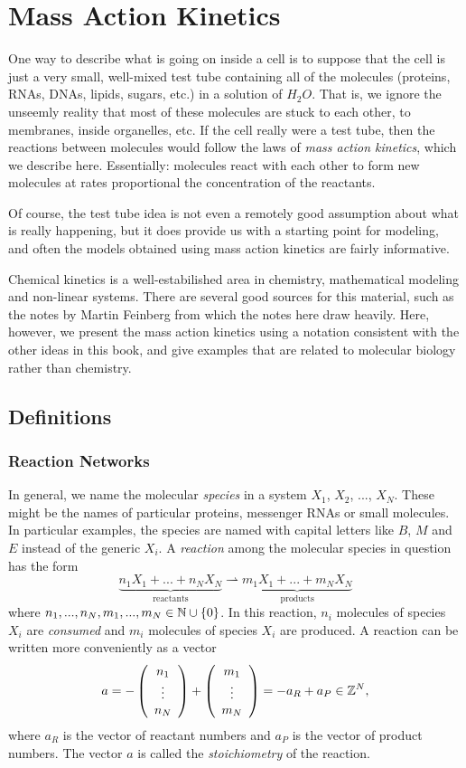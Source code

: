 \chapter{Mass Action Kinetics} \label{ch:mak}

One way to describe what is going on inside a cell is to suppose that
the cell is just a very small, well-mixed test tube containing all of
the molecules (proteins, RNAs, DNAs, lipids, sugars, etc.) in a
solution of $H_2O$. That is, we ignore the unseemly reality that most
of these molecules are stuck to each other, to membranes, inside
organelles, etc. If the cell really were a test tube, then the
reactions between molecules would follow the laws of {\em mass action
  kinetics}, which we describe here. Essentially: molecules react with
each other to form new molecules at rates proportional the
concentration of the reactants.

Of course, the test tube idea is not even a remotely good assumption
about what is really happening, but it does provide us with a starting
point for modeling, and often the models obtained using mass action
kinetics are fairly informative.

Chemical kinetics is a well-estabilished area in chemistry,
mathematical modeling and non-linear systems. There are several good
sources for this material, such as the notes by Martin Feinberg
\cite{feinberg-book} from which the notes here draw heavily. Here,
however, we present the mass action kinetics using a notation
consistent with the other ideas in this book, and give examples that
are related to molecular biology rather than chemistry.

\section{Definitions}

\subsection{Reaction Networks}

In general, we name the molecular {\em species} in a system $X_1$,
$X_2$, ..., $X_N$. These might be the names of particular proteins,
messenger RNAs or small molecules. In particular examples, the species
are named with capital letters like $B$, $M$ and $E$ instead of the
generic $X_i$. A {\em reaction} among the molecular species in
question has the form
%
$$
\underbrace{n_1 X_1 + ... + n_N X_N}_\mathrm{reactants}
  \rightharpoonup \underbrace{m_1 X_1 + ... + m_N X_N}_\mathrm{products} 
$$
%
where $n_1, ..., n_N, m_1,...,m_N \in \mathbb{N} \cup \{0\}$. In this
reaction, $n_i$ molecules of species $X_i$ are {\em consumed} and
$m_i$ molecules of species $X_i$ are produced. A reaction can be
written more conveniently as a vector
%
\begin{equation}\label{eqn:reaction}
a = -\left ( \begin{array}{c} n_1 \\ \vdots \\ n_N \end{array} \right ) + \left ( \begin{array}{c} m_1 \\ \vdots \\ m_N \end{array} \right ) = -a_R + a_P \in \mathbb{Z}^N, 
\end{equation}
%
where $a_R$ is the vector of reactant numbers and $a_P$ is the vector
of product numbers. The vector $a$ is called the {\em stoichiometry} of the reaction.

